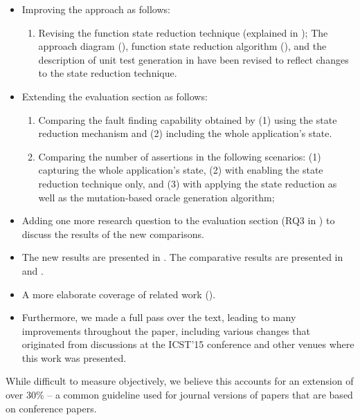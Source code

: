 \begin{itemize}

\item Improving the approach as follows:

\begin{enumerate}
\item Revising the function state reduction technique (explained in ); The approach diagram (), function state reduction algorithm (), and the description of unit test generation in  have been revised to reflect changes to the state reduction technique. 
\end{enumerate}

\item Extending the evaluation section as follows:

\begin{enumerate} 
\item Comparing the fault finding capability obtained by (1) using the state reduction mechanism and (2) including the whole application's state.
\item Comparing the number of assertions in the following scenarios:
(1) capturing the whole application's state, (2) with enabling the state reduction technique only, and (3) with applying the state reduction as well as the mutation-based oracle generation algorithm;
\end{enumerate}

\item Adding one more research question to the evaluation section (RQ3 in ) to discuss the results of the new comparisons. 

\item The new results are presented in . The comparative results are presented in  and .
\item A more elaborate coverage of related work ().
\item Furthermore, we made a full pass over the text,
   leading to many improvements throughout the paper,
   including various changes that originated from discussions at the
   ICST'15 conference and other venues where this work was presented. 

\end{itemize}

\medskip

While difficult to measure objectively, we believe this accounts for
   an extension of over 30\% -- a common guideline used for journal versions
   of papers that are based on conference papers.

